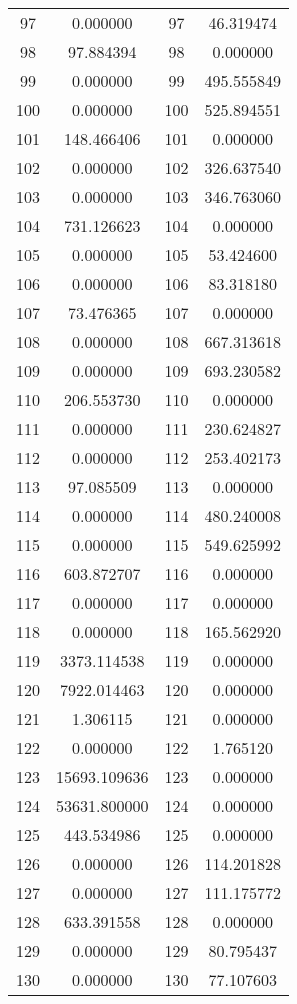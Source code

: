 \documentclass[12pt]{article}
\begin{document}
\begin{longtable}{@{}cccc@{}}
97 & 0.000000 & 97 & 46.319474 \\
98 & 97.884394 & 98 & 0.000000 \\
99 & 0.000000 & 99 & 495.555849 \\
100 & 0.000000 & 100 & 525.894551 \\
101 & 148.466406 & 101 & 0.000000 \\
102 & 0.000000 & 102 & 326.637540 \\
103 & 0.000000 & 103 & 346.763060 \\
104 & 731.126623 & 104 & 0.000000 \\
105 & 0.000000 & 105 & 53.424600 \\
106 & 0.000000 & 106 & 83.318180 \\
107 & 73.476365 & 107 & 0.000000 \\
108 & 0.000000 & 108 & 667.313618 \\
109 & 0.000000 & 109 & 693.230582 \\
110 & 206.553730 & 110 & 0.000000 \\
111 & 0.000000 & 111 & 230.624827 \\
112 & 0.000000 & 112 & 253.402173 \\
113 & 97.085509 & 113 & 0.000000 \\
114 & 0.000000 & 114 & 480.240008 \\
115 & 0.000000 & 115 & 549.625992 \\
116 & 603.872707 & 116 & 0.000000 \\
117 & 0.000000 & 117 & 0.000000 \\
118 & 0.000000 & 118 & 165.562920 \\
119 & 3373.114538 & 119 & 0.000000 \\
120 & 7922.014463 & 120 & 0.000000 \\
121 & 1.306115 & 121 & 0.000000 \\
122 & 0.000000 & 122 & 1.765120 \\
123 & 15693.109636 & 123 & 0.000000 \\
124 & 53631.800000 & 124 & 0.000000 \\
125 & 443.534986 & 125 & 0.000000 \\
126 & 0.000000 & 126 & 114.201828 \\
127 & 0.000000 & 127 & 111.175772 \\
128 & 633.391558 & 128 & 0.000000 \\
129 & 0.000000 & 129 & 80.795437 \\
130 & 0.000000 & 130 & 77.107603 \\

\end{longtable}
\end{document}
